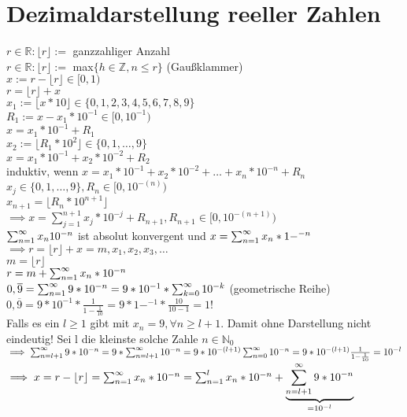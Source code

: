\section{Dezimaldarstellung reeller Zahlen}
$r\in\mathbb{R}:\lfloor r \rfloor :=$ ganzzahliger Anzahl\\
$r\in\mathbb{R}:\lfloor r \rfloor :=$ max$\{h\in\mathbb{Z}, n \leq r\}$ (Gaußklammer)\\
$x := r - \lfloor r \rfloor \in [0,1)$\\
$r = \lfloor r \rfloor + x$\\
$x_1 := \lfloor x * 10 \rfloor \in \{0,1,2,3,4,5,6,7,8,9\}$\\
$R_1 := x - x_1 * 10^{-1} \in [0,10^{-1})$\\
$x=x_1*10^{-1} + R_1$\\
$x_2 := \lfloor R_1 * 10^2 \rfloor \in \{0,1,\ldots ,9\}$\\
$x = x_1 * 10^{-1} + x_2 * 10^{-2} + R_2$\\
induktiv, wenn $x = x_1 * 10^{-1} + x_2 * 10^{-2} + \ldots + x_n * 10^{-n} + R_n$\\
$x_j \in \{0,1,\ldots,9\}, R_n \in [0,10^{-(n)})$\\
$x_{n+1} = \lfloor R_n * 10^{n+1} \rfloor$\\
$\implies x=\sum_{j=1}^{n+1} x_j * 10^{-j} + R_{n+1}, R_{n+1} \in [0,10^{-(n+1)})$\\
$\sum_{n=1}^{\infty} x_n 10^{-n}$ ist absolut konvergent und $x=\sum_{n=1}^{\infty} x_n * 1-^{-n}$\\
$\implies r = \lfloor r \rfloor + x = m,x_1,x_2,x_3,\ldots$\\
$m = \lfloor r \rfloor$\\
$r = m + \sum_{n=1}^{\infty} x_n * 10^{-n}$\\
$0,\overline{9} = \sum_{n=1}^{\infty}	9 * 10^{-n} = 9 * 10^{-1} * \sum_{k=0}^\infty 10^{-k}$ (geometrische Reihe)\\
$0,\overline{9} = 9 * 10^{-1} * \frac{1}{1-\frac{1}{10}} = 9 * 1-^{-1} * \frac{10}{10-1} = 1$!\\
Falls es ein $l \geq 1$ gibt mit $x_n = 9, \forall n \geq l + 1$. Damit ohne Darstellung nicht eindeutig! Sei l die kleinste solche Zahle $n\in\mathbb{N}_0$\\
$\implies \sum_{n=l+1}^\infty 9 * 10^{-n} = 9 * \sum_{n=l+1}^\infty 10^{-n} = 9 * 10 ^{-(l+1)} \sum_{n=0}^{\infty} 10^{-n} = 9 * 10^{-(l+1)} \frac{1}{1-\frac{1}{10}} = 10^{-l}$\\
$\implies x = r - \lfloor r \rfloor = \sum_{n=1}^{\infty} x_n * 10^{-n} = \sum_{n=1}^l x_n * 10^{-n} + \underbrace{\sum_{n=l+1}^\infty 9 * 10^{-n}}_{=10^{-l}}$\\
